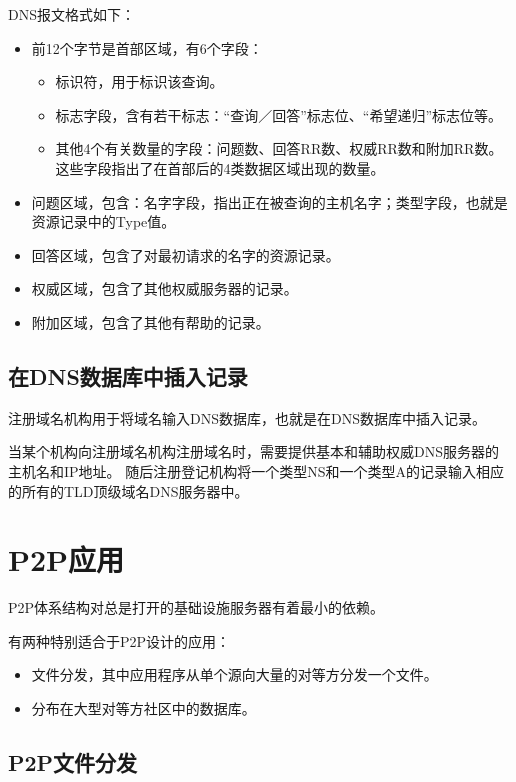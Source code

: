 \documentclass[a4paper,left=2.5cm,right=2.5cm,11pt]{article}
\begin{document}
	DNS报文格式如下：
	\begin{itemize}
		\item 前12个字节是首部区域，有6个字段：
		\begin{itemize}
			\item 标识符，用于标识该查询。
			\item 标志字段，含有若干标志：“查询／回答”标志位、“希望递归”标志位等。
			\item 其他4个有关数量的字段：问题数、回答RR数、权威RR数和附加RR数。这些字段指出了在首部后的4类数据区域出现的数量。
		\end{itemize}

		\item 问题区域，包含：名字字段，指出正在被查询的主机名字；类型字段，也就是资源记录中的Type值。

		\item 回答区域，包含了对最初请求的名字的资源记录。

		\item 权威区域，包含了其他权威服务器的记录。

		\item 附加区域，包含了其他有帮助的记录。
	\end{itemize}

\subsection{在DNS数据库中插入记录}
	注册域名机构用于将域名输入DNS数据库，也就是在DNS数据库中插入记录。\par

	当某个机构向注册域名机构注册域名时，需要提供基本和辅助权威DNS服务器的主机名和IP地址。
	随后注册登记机构将一个类型NS和一个类型A的记录输入相应的所有的TLD顶级域名DNS服务器中。

\section{P2P应用}
	P2P体系结构对总是打开的基础设施服务器有着最小的依赖。\par

	有两种特别适合于P2P设计的应用：
	\begin{itemize}
		\item 文件分发，其中应用程序从单个源向大量的对等方分发一个文件。
		\item 分布在大型对等方社区中的数据库。
	\end{itemize}

\subsection{P2P文件分发}
	
\end{document}
